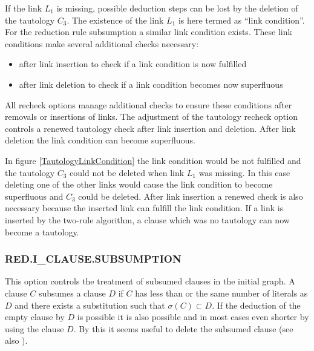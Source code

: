                                             
               
If the link $L_1$ is missing, possible deduction steps can be lost by the 
deletion of the tautology $C_3$. The existence of the link $L_1$ is here 
termed as 
``link condition''. For the reduction rule subsumption a 
similar link condition exists. These link 
conditions make several additional checks necessary: 
\begin{itemize}
\item after link insertion to check if a link condition is now fulfilled
\item after link deletion to check if a link condition becomes now superfluous
\end{itemize}
All recheck options manage additional checks to ensure these conditions
after removals or insertions of links.
The adjustment of the tautology recheck
option controls a renewed tautology check after 
link insertion and deletion. After link deletion the link condition can 
become superfluous.

\Ex

In figure \ref{TautologyLinkCondition} the link condition would be not
fulfilled and the tautology $C_3$ could not be deleted when link $L_1$
was missing. In this case deleting one of the other links would cause
the link condition to become superfluous and $C_3$ could be deleted.
After link insertion a renewed check is also necessary because the
inserted link can fulfill the link condition. If a link is inserted by
the two-rule algorithm, a clause which was no tautology can now become
a tautology.
                                     
\PO
{}



\subsubsection{RED.I\_CLAUSE.SUBSUMPTION}
  

This option controls the treatment of subsumed clauses in the initial
graph. A clause $C$ subsumes a clause $D$ if $C$ has less than or the same
number of literals as
$D$ and there exists a substitution such that $\sigma(C) \subset
D$. If the deduction of the empty clause by $D$ is possible it is also
possible and in most cases even shorter by using the clause $D$. By
this it seems useful to delete the subsumed clause (see also
\cite{Loveland78,Raph84}).


